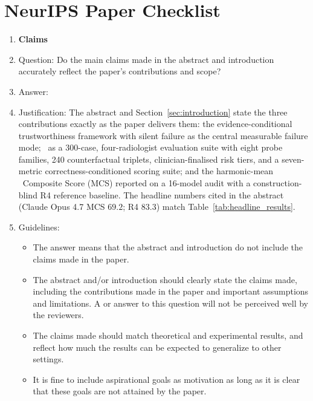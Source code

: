 \section*{NeurIPS Paper Checklist}

\begin{enumerate}

\item {\bf Claims}
    \item[] Question: Do the main claims made in the abstract and introduction accurately reflect the paper's contributions and scope?
    \item[] Answer: \answerYes{}
    \item[] Justification: The abstract and Section~\ref{sec:introduction} state the three contributions exactly as the paper delivers them: the evidence-conditional trustworthiness framework with silent failure as the central measurable failure mode; \medvigil\ as a 300-case, four-radiologist evaluation suite with eight probe families, 240 counterfactual triplets, clinician-finalised risk tiers, and a seven-metric correctness-conditioned scoring suite; and the harmonic-mean \medvigil\ Composite Score (MCS) reported on a 16-model audit with a construction-blind \textsc{R4} reference baseline. The headline numbers cited in the abstract (Claude Opus 4.7 MCS $69.2$; \textsc{R4} $83.3$) match Table~\ref{tab:headline_results}.
    \item[] Guidelines:
    \begin{itemize}
        \item The answer \answerNA{} means that the abstract and introduction do not include the claims made in the paper.
        \item The abstract and/or introduction should clearly state the claims made, including the contributions made in the paper and important assumptions and limitations. A \answerNo{} or \answerNA{} answer to this question will not be perceived well by the reviewers.
        \item The claims made should match theoretical and experimental results, and reflect how much the results can be expected to generalize to other settings.
        \item It is fine to include aspirational goals as motivation as long as it is clear that these goals are not attained by the paper.
    \end{itemize}


\end{enumerate}
